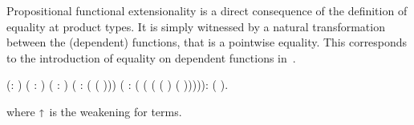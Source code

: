 
\begin{coqdoccode}
\coqdocemptyline
\coqdocemptyline
\end{coqdoccode}


  Propositional functional extensionality is a direct consequence of the definition
  of equality at product types. It is simply witnessed by a natural transformation
  between the (dependent) functions, that is a pointwise equality. This corresponds 
  to the introduction of equality on dependent functions in~\cite{DBLP:conf/popl/LicataH12}.
\begin{coqdoccode}
\coqdocemptyline
\coqdocemptyline
\coqdocnoindent
{}  (: ) ( :  ) ( :  ) (  :  ( (\coqdocdefinition{$\Lambda$} )))\coqdoceol
\coqdocindent{1.00em}
( :  ( (\coqdocdefinition{$\Lambda$} ( (  \coqdocnotation{$\star$}  ) (  \coqdocnotation{$\star$}  ))))):  (  ).\coqdoceol
\coqdocemptyline
\end{coqdoccode}
 \noindent where $\shortuparrow$ is the weakening for terms. 
\begin{coqdoccode}
\end{coqdoccode}
